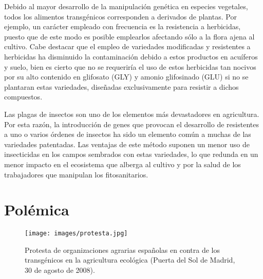 \documentclass[11pt,twoside]{article}
\begin{document}
Debido al mayor desarrollo de la manipulación genética en especies vegetales, todos los alimentos transgénicos corresponden a derivados de plantas. Por ejemplo, un carácter empleado con frecuencia es la resistencia a herbicidas, puesto que de este modo es posible emplearlos afectando sólo a la flora ajena al cultivo. Cabe destacar que el empleo de variedades modificadas y resistentes a herbicidas ha disminuido la contaminación debido a estos productos en acuíferos y suelo, bien es cierto que no se requeriría el uso de estos herbicidas tan nocivos por su alto contenido en glifosato (GLY) y amonio glifosinado (GLU) si no se plantaran estas variedades, diseñadas exclusivamente para resistir a dichos compuestos.




Las plagas de insectos son uno de los elementos más devastadores en agricultura. Por esta razón, la introducción de genes que provocan el desarrollo de resistentes a uno o varios órdenes de insectos ha sido un elemento común a muchas de las variedades patentadas. Las ventajas de este método suponen un menor uso de insecticidas en los campos sembrados con estas variedades, lo que redunda en un menor impacto en el ecosistema que alberga al cultivo y por la salud de los trabajadores que manipulan los fitosanitarios.








\section{Polémica}\label{seccion.polemica}


%


\begin{figure}[h!]
\begin{center}
\texttt{[image: images/protesta.jpg]}
\end{center}
\caption{ Protesta de organizaciones agrarias españolas en contra de los transgénicos en la agricultura ecológica (Puerta del Sol de Madrid, 30 de agosto de 2008).}\label{fig.protestas}
\end{figure}
\end{document}
